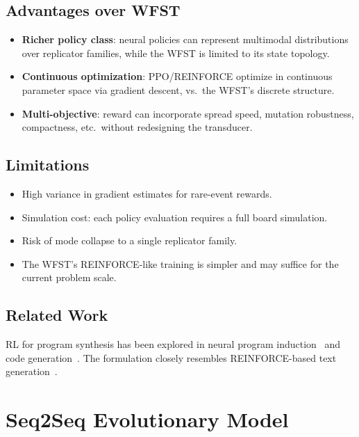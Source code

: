 \documentclass{article}
\begin{document}
\subsection{Advantages over WFST}

\begin{itemize}
  \item \textbf{Richer policy class}: neural policies can represent
        multimodal distributions over replicator families, while the
        WFST is limited to its state topology.
  \item \textbf{Continuous optimization}: PPO/REINFORCE optimize in
        continuous parameter space via gradient descent, vs.\ the WFST's
        discrete structure.
  \item \textbf{Multi-objective}: reward can incorporate spread speed,
        mutation robustness, compactness, etc.\ without redesigning the
        transducer.
\end{itemize}

\subsection{Limitations}

\begin{itemize}
  \item High variance in gradient estimates for rare-event rewards.
  \item Simulation cost: each policy evaluation requires a full board
        simulation.
  \item Risk of mode collapse to a single replicator family.
  \item The WFST's REINFORCE-like training is simpler and may suffice
        for the current problem scale.
\end{itemize}

\subsection{Related Work}

RL for program synthesis has been explored in
neural program induction~\cite{bunel2018leveraging} and
code generation~\cite{le2022coderl}.
The formulation closely resembles REINFORCE-based text
generation~\cite{williams1992simple,ranzato2016sequence}.


\section{Seq2Seq Evolutionary Model}
\label{sec:seq2seq}
\end{document}
